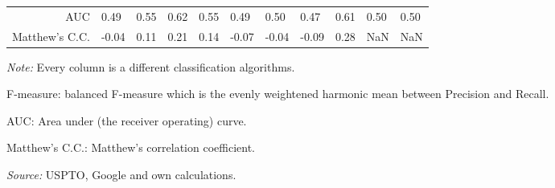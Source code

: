 \begin{table}
\begin{small}
\begin{threeparttable}
\begin{tabular}{rllllllllll}
AUC & 0.49 & 0.55 & 0.62 & 0.55 & 0.49 & 0.50 & 0.47 & 0.61 & 0.50 & 0.50  \tabularnewline 
Matthew's C.C. & -0.04 & 0.11 & 0.21 & 0.14 & -0.07 & -0.04 & -0.09 & 0.28 & NaN & NaN  \tabularnewline 
\bottomrule 
\end{tabular} 
\begin{tablenotes}
\small
\item\textit{Note:} Every column is a different classification algorithms.
\item F-measure: balanced F-measure which is the evenly weightened harmonic mean between Precision and Recall. 
\item AUC: Area under (the receiver operating) curve.
\item Matthew's C.C.: Matthew's correlation coefficient.
\item\textit{Source:} USPTO, Google and own calculations.
\end{tablenotes}
\end{threeparttable}
\end{small}
\end{table}
